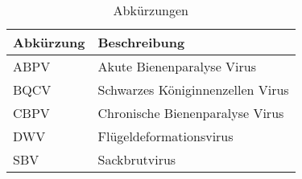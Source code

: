 \begin{table}[h!]
    \centering
    \caption{Abkürzungen}
    \label{tab:g:abkürzungen}
    \begin{tabular}{|l|l|}
        \hline
        Abkürzung   &   Beschreibung\\
        \hline
        ABPV        & Akute Bienenparalyse Virus\\
        BQCV        & Schwarzes Königinnenzellen Virus\\
        CBPV        & Chronische Bienenparalyse Virus\\
        DWV         & Flügeldeformationsvirus\\
        SBV         & Sackbrutvirus\\
        \hline
    \end{tabular}
\end{table}